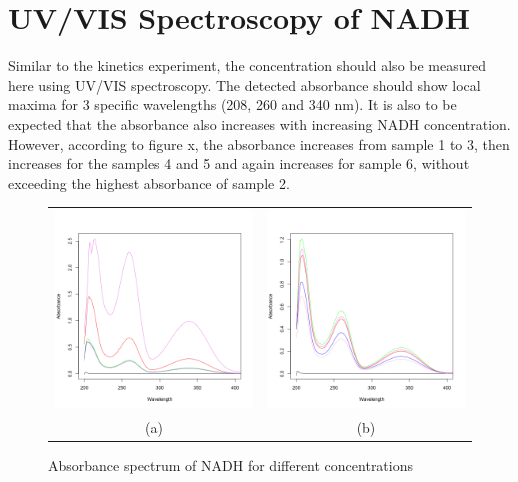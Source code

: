 \documentclass[a4paper,11pt]{article}
\begin{document}
    \pagebreak

    \section{UV/VIS Spectroscopy of NADH}
    Similar to the kinetics experiment, the concentration should also be measured here using UV/VIS spectroscopy.
    The detected absorbance should show local maxima for 3 specific wavelengths (208, 260 and 340 nm). It is also to be expected that the absorbance also increases with increasing NADH concentration. However, according to figure x, the absorbance increases from sample 1 to 3, then increases for the samples 4 and 5 and again increases for sample 6, without exceeding the highest absorbance of sample 2. 

        \begin{figure}[H]
            \centering
            \begin{tabular}{cc}
                \includegraphics[width=200px]{../resources/absorption_r1_spectrum.png} &
                \includegraphics[width=200px]{../resources/absorption_r2_spectrum.png} \\
                (a) & (b)\\
            \end{tabular}
            \caption{Absorbance spectrum of NADH for different concentrations}
            \label{fig:abs_spectrum}
        \end{figure}
\end{document}
